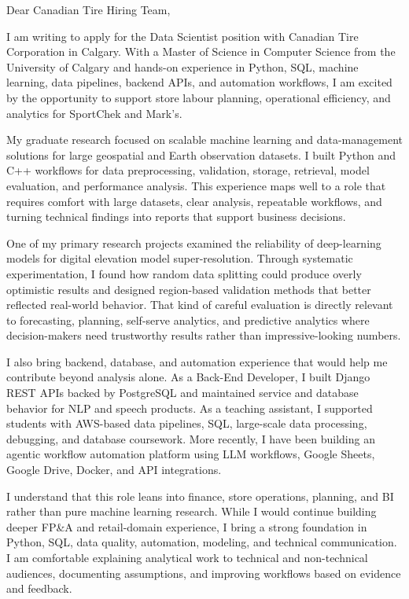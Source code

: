 \documentclass[11pt]{letter}
\begin{document}
\begin{letter}{}

\opening{Dear Canadian Tire Hiring Team,}

I am writing to apply for the Data Scientist position with Canadian Tire Corporation in Calgary. With a Master of Science in Computer Science from the University of Calgary and hands-on experience in Python, SQL, machine learning, data pipelines, backend APIs, and automation workflows, I am excited by the opportunity to support store labour planning, operational efficiency, and analytics for SportChek and Mark's.

My graduate research focused on scalable machine learning and data-management solutions for large geospatial and Earth observation datasets. I built Python and C++ workflows for data preprocessing, validation, storage, retrieval, model evaluation, and performance analysis. This experience maps well to a role that requires comfort with large datasets, clear analysis, repeatable workflows, and turning technical findings into reports that support business decisions.

One of my primary research projects examined the reliability of deep-learning models for digital elevation model super-resolution. Through systematic experimentation, I found how random data splitting could produce overly optimistic results and designed region-based validation methods that better reflected real-world behavior. That kind of careful evaluation is directly relevant to forecasting, planning, self-serve analytics, and predictive analytics where decision-makers need trustworthy results rather than impressive-looking numbers.

I also bring backend, database, and automation experience that would help me contribute beyond analysis alone. As a Back-End Developer, I built Django REST APIs backed by PostgreSQL and maintained service and database behavior for NLP and speech products. As a teaching assistant, I supported students with AWS-based data pipelines, SQL, large-scale data processing, debugging, and database coursework. More recently, I have been building an agentic workflow automation platform using LLM workflows, Google Sheets, Google Drive, Docker, and API integrations.

I understand that this role leans into finance, store operations, planning, and BI rather than pure machine learning research. While I would continue building deeper FP\&A and retail-domain experience, I bring a strong foundation in Python, SQL, data quality, automation, modeling, and technical communication. I am comfortable explaining analytical work to technical and non-technical audiences, documenting assumptions, and improving workflows based on evidence and feedback.


\end{letter}
\end{document}
